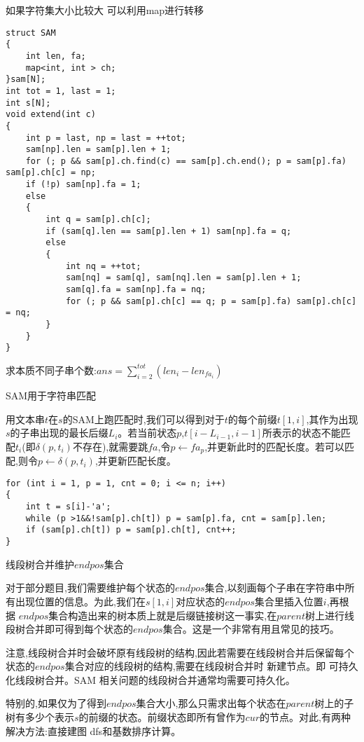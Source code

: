 \documentclass[a4paper, fontset=none]{ctexart}
\begin{document}
如果字符集大小比较大 可以利用map进行转移

\begin{verbatim}
struct SAM
{
    int len, fa;
    map<int, int > ch;
}sam[N];
int tot = 1, last = 1;
int s[N];
void extend(int c)
{
    int p = last, np = last = ++tot;
    sam[np].len = sam[p].len + 1;
    for (; p && sam[p].ch.find(c) == sam[p].ch.end(); p = sam[p].fa) sam[p].ch[c] = np;
    if (!p) sam[np].fa = 1;
    else
    {
        int q = sam[p].ch[c];
        if (sam[q].len == sam[p].len + 1) sam[np].fa = q;
        else
        {
            int nq = ++tot;
            sam[nq] = sam[q], sam[nq].len = sam[p].len + 1;
            sam[q].fa = sam[np].fa = nq;
            for (; p && sam[p].ch[c] == q; p = sam[p].fa) sam[p].ch[c] = nq;
        }
    }
}
\end{verbatim}

求本质不同子串个数:$ans=\sum\limits_{i=2}^{tot}(len_i-len_{fa_i})$

SAM用于字符串匹配

用文本串$t$在$s$的SAM上跑匹配时,我们可以得到对于$t$的每个前缀$t[1, i]$,其作为出现$s$的子串出现的最长后缀$L_i$。若当前状态$p$,$t[i-L_{i-1}, i-1]$所表示的状态不能匹配$t_i$(即$\delta(p, t_i)$不存在),就需要跳$fa$,令$p\leftarrow fa_p$,并更新此时的匹配长度。若可以匹配,则令$p\leftarrow \delta(p, t_i)$,并更新匹配长度。

\begin{verbatim}
for (int i = 1, p = 1, cnt = 0; i <= n; i++)
{
    int t = s[i]-'a';
    while (p >1&&!sam[p].ch[t]) p = sam[p].fa, cnt = sam[p].len;
    if (sam[p].ch[t]) p = sam[p].ch[t], cnt++;
}
\end{verbatim}

线段树合并维护$endpos$集合

对于部分题目,我们需要维护每个状态的$endpos$集合,以刻画每个子串在字符串中所有出现位置的信息。为此,我们在$s[1, i]$对应状态的$endpos$集合里插入位置$i$,再根据 $endpos$集合构造出来的树本质上就是后缀链接树这一事实,在$parent$树上进行线段树合并即可得到每个状态的$endpos$集合。这是一个非常有用且常见的技巧。

注意,线段树合并时会破坏原有线段树的结构,因此若需要在线段树合并后保留每个状态的$endpos$集合对应的线段树的结构,需要在线段树合并时 新建节点。即 可持久化线段树合并。SAM 相关问题的线段树合并通常均需要可持久化。

特别的,如果仅为了得到$endpos$集合大小,那么只需求出每个状态在$parent$树上的子树有多少个表示$s$的前缀的状态。前缀状态即所有曾作为$cur$的节点。对此,有两种解决方法:直接建图 dfs和基数排序计算。
\end{document}

